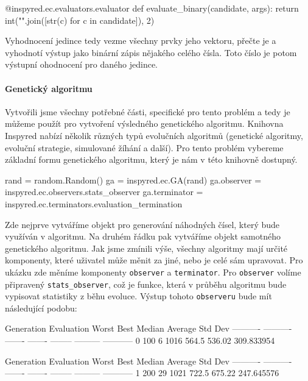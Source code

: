 \begin{code}
@inspyred.ec.evaluators.evaluator
def evaluate_binary(candidate, args):
    return int("".join([str(c) for c in candidate]), 2)
\end{code}

Vyhodnocení jedince tedy vezme všechny prvky jeho vektoru, přečte je a
vyhodnotí výstup jako binární zápis nějakého celého čísla. Toto číslo je potom
výstupní ohodnocení pro daného jedince.

\paragraph{Genetický algoritmu}
Vytvořili jsme všechny potřebné části, specifické pro tento problém a tedy je
můžeme použít pro vytvoření výsledného genetického algoritmu. Knihovna Inspyred
nabízí několik různých typů evolučních algoritmů (genetické algoritmy, evoluční
strategie, simulované žíhání a další). Pro tento problém vybereme
základní formu genetického algoritmu, který je nám v této knihovně dostupný.

\begin{code}
rand = random.Random()
ga = inspyred.ec.GA(rand)
ga.observer = inspyred.ec.observers.stats_observer
ga.terminator = inspyred.ec.terminators.evaluation_termination
\end{code}

Zde nejprve vytváříme objekt pro generování náhodných čísel, který bude
využíván v algoritmu. Na druhém řádku pak vytváříme objekt samotného
genetického algoritmu. Jak jsme zmínili výše, všechny algoritmy mají určité
komponenty, které uživatel může měnit za jiné, nebo je celé sám upravovat. Pro
ukázku zde měníme komponenty \texttt{observer} a \texttt{terminator}. Pro
\texttt{observer} volíme připravený \texttt{stats\_observer}, což je funkce,
která v průběhu algoritmu bude vypisovat statistiky z běhu evoluce. Výstup
tohoto \texttt{observeru} bude mít následující podobu:

\begin{code}
Generation Evaluation   Worst    Best   Median   Average     Std Dev
---------- ---------- ------- ------- -------- --------- -----------      
         0        100       6    1016    564.5    536.02  309.833954

Generation Evaluation   Worst    Best   Median   Average     Std Dev
---------- ---------- ------- ------- -------- --------- -----------     
         1        200      29    1021    722.5    675.22  247.645576
\end{code}

